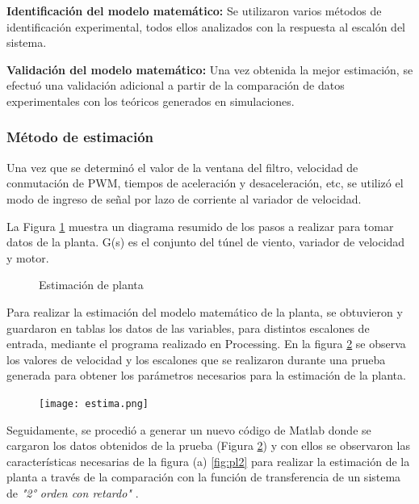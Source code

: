  \textbf{Identificación del modelo matemático:} Se utilizaron varios métodos de identificación experimental, todos ellos analizados con la respuesta al escalón del sistema.

 \textbf{Validación del modelo matemático:} Una vez obtenida la mejor estimación, se efectuó una validación adicional a partir de la comparación de datos experimentales con los teóricos generados en simulaciones.






    \subsubsection{Método de estimación}

    Una vez que se determinó el valor de la ventana del filtro, velocidad de conmutación de PWM, tiempos de aceleración y desaceleración, etc, se utilizó el modo de ingreso de señal por lazo de corriente al variador de velocidad. 
    
    La Figura \ref{fig:bloques} muestra un diagrama resumido de los pasos a realizar para tomar datos de la planta. G(s) es el conjunto del túnel de viento, variador de velocidad y motor.


\begin{figure}[htbp]
	\centering
	\centering
	\caption{Estimación de planta} \label{fig:bloques}
\end{figure}
 
    
    Para realizar la estimación del modelo matemático de la planta, se obtuvieron y guardaron en tablas los datos de las variables, para distintos escalones de entrada, mediante el programa realizado en Processing. En la figura \ref{fig:est2}
    se observa los valores de velocidad y los escalones que se realizaron durante una prueba generada para obtener los parámetros necesarios para la estimación de la planta.
    
    \begin{figure}[htb]
    	\centering
    	\texttt{[image: estima.png]} %
    	\label{fig:est2}    
    \end{figure}
    
    Seguidamente, se procedió a generar un nuevo código de Matlab donde se cargaron los datos obtenidos de la prueba (Figura \ref{fig:est2}) y con ellos se observaron las características necesarias de la figura (a) \ref{fig:pl2} para realizar la estimación de la planta a través de la comparación con la función de transferencia de un sistema de \textit{"2° orden con retardo"} \cite{pomares2011sistemas}.
    
